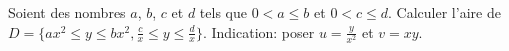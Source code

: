 \begin{exercice}\label{exoIntegralesMultiples0010}


Soient des nombres $a$, $b$, $c$ et $d$ tels que $0<a\leq b$ et $0<c\leq d$. Calculer l'aire de $D= \{ax^2\leq y\leq bx^2, \frac cx\leq y\leq \frac d x\}$. Indication: poser $u=\frac y{x^2}$ et $v=xy$.

\end{exercice}
